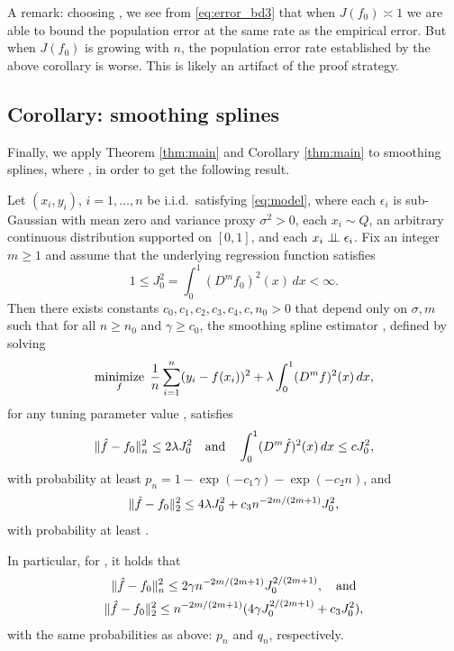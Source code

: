 \documentclass{article}
\begin{document}
A remark: choosing , we see from \eqref{eq:error_bd3} that when $J(f_0) \asymp 1$ we are
able to bound the population error at the same rate  as
the empirical error. But when $J(f_0)$ is growing with $n$, the population
error rate established by the above corollary is worse. This is likely an
artifact of the proof strategy.  

\subsection{Corollary: smoothing splines}

Finally, we apply Theorem \ref{thm:main} and Corollary \ref{thm:main} to
smoothing splines, where , in order 
to get the following result.  

\begin{corollary}
\label{cor:ss}
Let $(x_i,y_i)$, $i=1,\dots,n$ be i.i.d.\ satisfying \eqref{eq:model}, where
each $\epsilon_i$ is sub-Gaussian with mean zero and variance proxy
$\sigma^2>0$, each $x_i \sim Q$, an arbitrary continuous distribution supported
on $[0,1]$, and each $x_i \perp\!\!\!\perp \epsilon_i$. Fix an integer $m \geq 1$ and
assume that the underlying regression function satisfies  
\[
1 \leq  J_0^2 = \int_0^1 (D^m f_0)^2(x) \, dx < \infty.
\]
Then there exists constants $c_0,c_1,c_2,c_3,c_4,c,n_0>0$ that depend only on     
$\sigma,m$ such that for all $n \geq n_0$ and $\gamma \geq c_0$, the
smoothing spline estimator \smash{$\hf$}, defined by solving
\[
\mathop{\mathrm{minimize}}_f \; \frac{1}{n} \sum_{i=1}^n (y_i - f(x_i))^2 + \lambda \int_0^1 (D^m
f)^2(x) \, dx, 
\]
for any tuning parameter value , satisfies       
\[
\|\hat{f} - f_0\|_n^2 \leq 2 \lambda J_0^2\quad \text{and} \quad 
\int_0^1 (D^m \hat{f})^2(x) \, dx \leq c J_0^2, 
\]
with probability at least $p_n = 1 - \exp(-c_1\gamma) - \exp(-c_2n)$, and
\[
\|\hat{f} - f_0\|_2^2 \leq 4 \lambda J_0^2 + c_3 n^{-2m/(2m+1)} J_0^2,
\]
with probability at least . 

In particular, for ,
it holds that 
\begin{gather*}
\|\hat{f} - f_0\|_n^2 \leq 2 \gamma n^{-2m/(2m+1)} J_0^{2/(2m+1)}, 
\quad \text{and} \\ 
\|\hat{f} - f_0\|_2^2 \leq n^{-2m/(2m+1)} (4 \gamma J_0^{2/(2m+1)} + c_3 J_0^2), 
\end{gather*}
with the same probabilities as above: $p_n$ and $q_n$, respectively.
\end{corollary}
\end{document}
